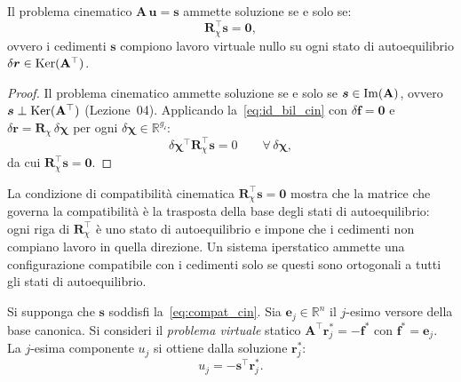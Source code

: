 \begin{corollario}
	\label{cor:compat_cin}
	Il problema cinematico $\bm{A}\,\bm{u} = \bm{s}$
	ammette soluzione se e solo se:
	\begin{equation}\label{eq:compat_cin}
		\bm{R}_\chi^{\top}\bm{s} = \bm{0},
	\end{equation}
	ovvero i cedimenti $\bm{s}$ compiono lavoro virtuale
	nullo su ogni stato di autoequilibrio
	$\delta\bm{r} \in \operatorname{Ker}(\mathbf{A}^{\top})$.
\end{corollario}

\begin{proof}
	Il problema cinematico ammette soluzione se e solo se
	$\bm{s} \in \operatorname{Im}(\mathbf{A})$, ovvero $\bm{s} \perp
	\operatorname{Ker}(\mathbf{A}^{\top})$ (Lezione~04). Applicando
	la~\eqref{eq:id_bil_cin} con $\delta\bm{f} = \bm{0}$
	e $\delta\bm{r} = \bm{R}_\chi\,\delta\bm{\chi}$ per ogni
	$\delta\bm{\chi} \in \mathbb{R}^{g_{\mathscr{i}}}$:
	\begin{equation}
		\delta\bm{\chi}^{\top}\bm{R}_\chi^{\top}\bm{s} = 0
		\qquad \forall\,\delta\bm{\chi},
	\end{equation}
	da cui $\bm{R}_\chi^{\top}\bm{s} = \bm{0}$.
\end{proof}

\begin{oss}
	La condizione di compatibilità cinematica
	$\bm{R}_\chi^{\top}\bm{s} = \bm{0}$ mostra che la
	matrice che governa la compatibilità è la trasposta
	della base degli stati di autoequilibrio: ogni riga
	di $\bm{R}_\chi^{\top}$ è uno stato di autoequilibrio
	e impone che i cedimenti non compiano lavoro in quella
	direzione. Un sistema iperstatico ammette una
	configurazione compatibile con i cedimenti solo se
	questi sono ortogonali a tutti gli stati di
	autoequilibrio.
\end{oss}

\begin{corollario}
	\label{cor:carico_unitario}
	Si supponga che $\bm{s}$ soddisfi
	la~\eqref{eq:compat_cin}. Sia $\bm{e}_j \in
	\mathbb{R}^n$ il $j$-esimo versore della base canonica.
	Si consideri il \emph{problema virtuale} statico
	$\bm{A}^{\top}\bm{r}^*_j = -\bm{f}^*$ con
	$\bm{f}^* = \bm{e}_j$. La $j$-esima componente
	$u_j$ si ottiene dalla soluzione $\bm{r}^*_j$:
	\begin{equation}\label{eq:carico_unitario}
		u_j = -\bm{s}^{\top}\bm{r}^*_j.
	\end{equation}
\end{corollario}

